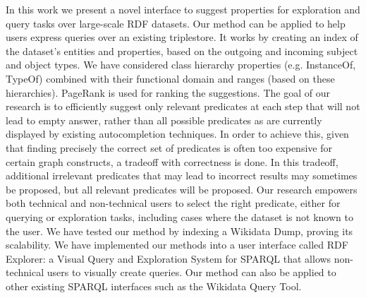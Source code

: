 \begin{intro}

In this work we present a novel interface to suggest properties for exploration and query tasks over large-scale RDF datasets. 
Our method can be applied to help users express queries over an existing triplestore. 
It works by creating an index of the dataset's entities and properties, based on the outgoing and incoming subject and object types.
We have considered class hierarchy properties (e.g. InstanceOf, TypeOf) combined with their functional domain and ranges (based on these hierarchies). 
PageRank is used for ranking the suggestions. 
The goal of our research is to efficiently suggest only relevant predicates at each step that will not lead to empty answer, rather than all possible predicates as are currently displayed by existing autocompletion techniques. 
In order to achieve this, given that finding precisely the correct set of predicates is often too expensive for certain graph constructs, a tradeoff with correctness is done. 
In this tradeoff, additional irrelevant predicates that may lead to incorrect results may sometimes be proposed, but all relevant predicates will be proposed.
Our research empowers both technical and non-technical users to select the right predicate, either for querying or exploration tasks, including cases where the dataset is not known to the user.
We have tested our method by indexing a Wikidata Dump, proving its scalability. 
We have implemented our methods into a user interface called RDF Explorer: a Visual Query and Exploration System for SPARQL that allows non-technical users to visually create queries. 
Our method can also be applied to other existing SPARQL interfaces such as the Wikidata Query Tool.

\end{intro}